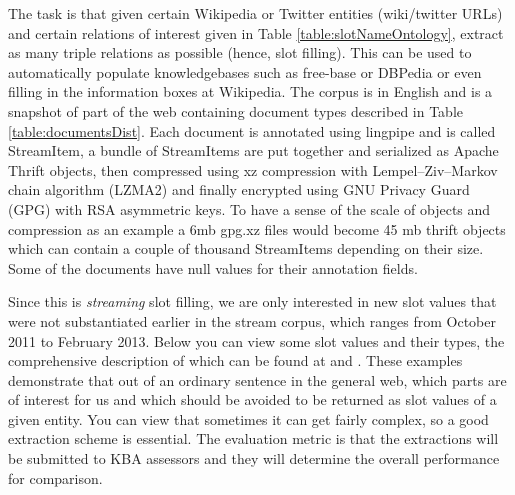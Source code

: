 The task is that given certain Wikipedia or Twitter entities 
(wiki/twitter URLs) and certain relations of interest given in Table  \ref{table:slotNameOntology}, extract as many triple relations as possible (hence, slot filling). This can be used to automatically populate knowledgebases such as free-base or DBPedia 
or even filling in the information boxes at Wikipedia. The corpus is in 
English and is a snapshot of part of the web containing document types described in Table \ref{table:documentsDist}. Each document is annotated using lingpipe and is called StreamItem, a bundle of 
StreamItems are put together and serialized as Apache Thrift objects, then 
compressed using xz compression with Lempel–Ziv–Markov chain algorithm (LZMA2) 
and finally encrypted using GNU Privacy Guard (GPG) with RSA asymmetric keys.
To have a sense of the scale of objects and compression as an example a 6mb
gpg.xz files would become 45 mb thrift objects which can contain a couple of 
thousand StreamItems depending on their size. Some of the documents have null 
values for their annotation fields.

Since this is \textit{streaming} slot filling, we are only interested in new 
slot values that were not substantiated earlier in the stream corpus, which 
ranges from October 2011 to February 2013. Below you can view some slot values 
and their types, the comprehensive description of which can be found at
\cite{tackbp} and \cite{aec}. These examples demonstrate that out of an ordinary sentence in the general web, which parts are of interest for us and which should be avoided to be returned as slot values of a given entity. You can view that sometimes it can get fairly complex, so a good extraction scheme is essential. The evaluation metric is that the extractions will be submitted to KBA assessors and they will determine the overall performance for comparison.

